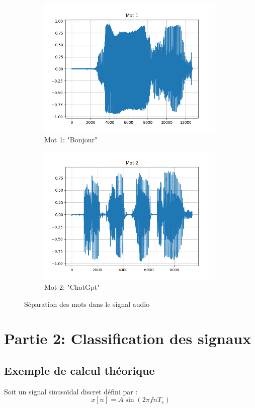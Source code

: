 \begin{figure}[h]
\centering
\begin{subfigure}[b]{0.45\textwidth}
    \centering
    \includegraphics[width=9cm]{screenshots/mot1_graphe.png}
    \caption{Mot 1: "Bonjour"}
\end{subfigure}
\hfill
\begin{subfigure}[b]{0.45\textwidth}
    \centering
    \includegraphics[width=9cm]{screenshots/mot2_graphe.png}
    \caption{Mot 2: "ChatGpt"}
\end{subfigure}
\caption{Séparation des mots dans le signal audio}
\end{figure}

\section{Partie 2: Classification des signaux}

\subsection{Exemple de calcul théorique}

Soit un signal sinusoïdal discret défini par :
\[
x[n] = A \sin(2\pi f n T_e)
\]

